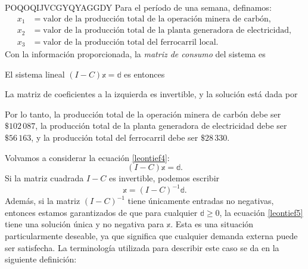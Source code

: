 \begin{examplebox}{}{POQOQIJVCGYQYAGGDY}
    \tcblower
    \solucion Para el período de una semana, definamos:
    \begin{align*}
        x_1 & = \text{valor de la producción total de la operación minera de carbón}, \\
        x_2 & = \text{valor de la producción total de la planta generadora de electricidad}, \\
        x_3 & = \text{valor de la producción total del ferrocarril local}.
    \end{align*}
    Con la información proporcionada, la \emph{matriz de consumo} del sistema es
    \begin{matrizn}
    \end{matrizn}
    \newpage
    El sistema lineal $(I - C)\mathbb{x} = \mathbb{d}$ es entonces
    \begin{matrizn}
    \end{matrizn}
    La matriz de coeficientes a la izquierda es invertible, y la solución está dada por
    \begin{matrizn}
    \end{matrizn}
    Por lo tanto, la producción total de la operación minera de carbón debe ser $\$102 \, 087$, la producción total de la planta generadora de electricidad debe ser $\$56 \, 163$, y la producción total del ferrocarril debe ser $\$28 \, 330$.
\end{examplebox}

Volvamos a considerar la ecuación \eqref{leontief4}:
$$(I - C)\mathbb{x} = \mathbb{d}.$$
Si la matriz cuadrada $I - C$ es invertible, podemos escribir
\begin{equation}
    \mathbb{x} = (I - C)^{-1}\mathbb{d}. \label{leontief5}
\end{equation}
Además, si la matriz $(I - C)^{-1}$ tiene únicamente entradas no negativas, entonces estamos garantizados de que para cualquier $\mathbb{d} \geq 0$, la ecuación \eqref{leontief5} tiene una solución única y no negativa para $\mathbb{x}$. Esta es una situación particularmente deseable, ya que significa que cualquier demanda externa puede ser satisfecha. La terminología utilizada para describir este caso se da en la siguiente definición:

